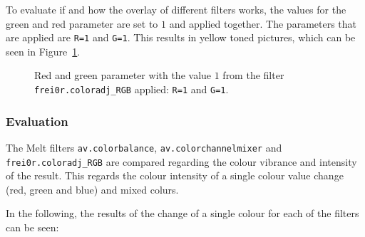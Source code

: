 \documentclass[../MasterThesis.tex]{subfiles}
\begin{document}
To evaluate if and how the overlay of different filters works, the values for the green and red parameter are set to $1$ and applied together. The parameters that are applied are \texttt{R=1} and \texttt{G=1}. This results in yellow toned pictures, which can be seen in Figure~\ref{figure:rg}.


\begin{figure}[H]
	\begin{center}
		\label{figure:rg}
		\caption[Red and green parameter set to $1$ with \texttt{frei0r.coloradj\_RGB}.]{Red and green parameter with the value $1$ from the filter \texttt{frei0r.coloradj\_RGB} applied: \texttt{R=1} and \texttt{G=1}.}
	\end{center}
\end{figure}




\subsubsection*{Evaluation}



The Melt filters \texttt{av.colorbalance}, \texttt{av.colorchannelmixer} and \texttt{frei0r.coloradj\_RGB} are compared regarding the colour vibrance and intensity of the result. This regards the colour intensity of a single colour value change (red, green and blue) and mixed colurs.


In the following, the results of the change of a single colour for each of the filters can be seen:
\end{document}
